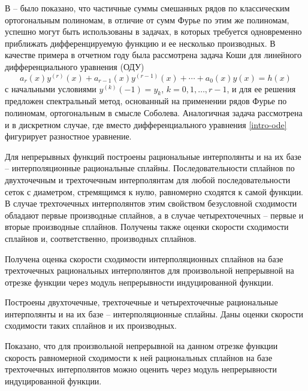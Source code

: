 В \cite{Haar-Tcheb-Shar11} -- \cite{Haar-Tcheb-Shar18} было показано, что частичные суммы смешанных рядов по классическим ортогональным полиномам, в отличие от сумм Фурье по этим же полиномам, успешно могут быть использованы в задачах, в которых требуется одновременно приближать дифференцируемую функцию и ее несколько производных. В качестве примера в отчетном году была рассмотрена задача Коши  для линейного дифференциального уравнения (ОДУ)
\begin{equation}\label{intro-ode}
 a_r(x)y^{(r)}(x)+a_{r-1}(x)y^{(r-1)}(x)+\cdots+a_0(x)y(x)=h(x)
 \end{equation}
с начальными условиями $y^{(k)}(-1)=y_k$, $k=0,1,\ldots,r-1$, и для ее решения предложен спектральный метод, основанный на применении рядов Фурье по полиномам, ортогональным в смысле Соболева. Аналогичная задача рассмотрена и в дискретном случае, где вместо дифференциального уравнения \eqref{intro-ode} фигурирует разностное уравнение.

Для непрерывных функций построены рациональные интерполянты и на их базе -- интерполяционные рациональные сплайны. Последовательности сплайнов по двухточечным и трехточечным интерполянтам для любой последовательности сеток с диаметром, стремящимся к нулю, равномерно сходятся к самой функции. В случае трехточечных интерполянтов этим свойством безусловной сходимости обладают первые производные сплайнов, а в случае четырехточечных – первые и вторые производные сплайнов. Получены также оценки скорости сходимости сплайнов и, соответственно, производных сплайнов.

Получена оценка скорости сходимости интерполяционных сплайнов на базе
трехточечных рациональных интерполянтов для произвольной непрерывной на
отрезке функции через модуль непрерывности индуцированной функции.

Построены двухточечные, трехточечные и четырехточечные рациональные интерполянты и на их базе --
интерполяционные сплайны.
Даны оценки скорости сходимости таких сплайнов и их производных.

Показано, что для произвольной непрерывной на данном отрезке функции  скорость равномерной
сходимости к ней    рациональных сплайнов на базе трехточечных интерполянтов можно оценить
через модуль непрерывности индуцированной функции.





